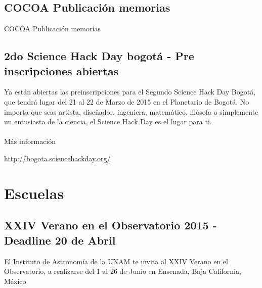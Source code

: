 \documentclass{book}
\begin{document}
\subsection{COCOA Publicación memorias}

COCOA Publicación memorias

\subsection{2do Science Hack Day bogotá - Pre inscripciones abiertas}

Ya están abiertas las preinscripciones para el Segundo Science Hack Day Bogotá, que tendrá lugar del 21 al 22 de Marzo de 2015 en el Planetario de Bogotá. No importa que seas artista, diseñador, ingeniera, matemático, filósofa o simplemente un entusiasta de la ciencia, el Science Hack Day es el lugar para ti.\\
\\
Más información
\begin{center}
\url{http://bogota.sciencehackday.org/}
\end{center}

                   \section*{Escuelas}

\subsection{XXIV Verano en el Observatorio 2015 - Deadline 20 de Abril}
El Instituto de Astronomía de la UNAM te invita al XXIV Verano en el Observatorio, a realizarse del 1 al 26 de Junio en Ensenada, Baja California, México
\end{document}
